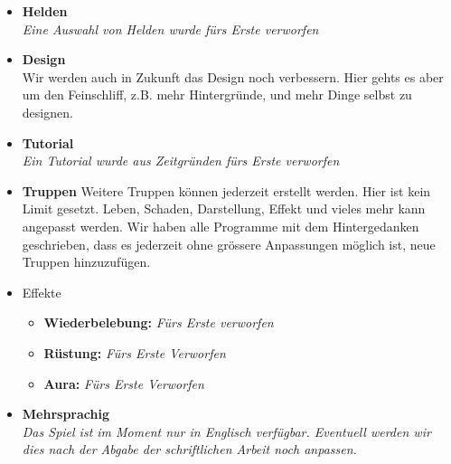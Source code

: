 \begin{itemize}
\begin{enumerate}
    \end{enumerate}
    \item \textbf{Helden} \\
        \textit{Eine Auswahl von Helden wurde fürs Erste verworfen}
    \item \textbf{Design} \\
        Wir werden auch in Zukunft das Design noch verbessern. Hier gehts es aber um den Feinschliff, z.B. mehr Hintergründe, und mehr Dinge selbst zu designen.
    \item \textbf{Tutorial} \\
        \textit{Ein Tutorial wurde aus Zeitgründen fürs Erste verworfen}
    \item \textbf{Truppen}
        Weitere Truppen können jederzeit erstellt werden. Hier ist kein Limit gesetzt. Leben, Schaden, Darstellung, Effekt und vieles mehr kann angepasst werden. 
        Wir haben alle Programme mit dem Hintergedanken geschrieben, dass es jederzeit ohne grössere Anpassungen möglich ist, neue Truppen hinzuzufügen.
    \item Effekte
    \begin{itemize}
        \item \textbf{Wiederbelebung:}
            \textit{Fürs Erste verworfen}
        \item \textbf{Rüstung:}
            \textit{Fürs Erste Verworfen}
        \item \textbf{Aura:}
            \textit{Fürs Erste Verworfen}
    \end{itemize}
    \item \textbf{Mehrsprachig} \\
        \textit{Das Spiel ist im Moment nur in Englisch verfügbar. Eventuell werden wir dies nach der Abgabe der schriftlichen Arbeit noch anpassen.}
\end{itemize}

